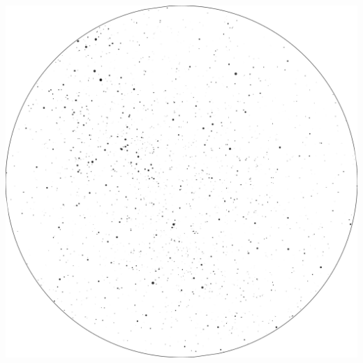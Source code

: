 \documentclass{./SAS-class-skygen}
\begin{document}
	\vspace{0.5cm}
    \begin{center}
    \includegraphics[width=\textwidth]{./pics/skychart35.png}
    \end{center}
    
    
\end{document}
